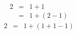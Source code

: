 \begin{eqnarray}
	2 & = & 1 + 1\\
	  & = & 1 + (2-1)
\end{eqnarray}
\begin{eqnarray*}
	2 & = & 1 + (1+1-1)
\end{eqnarray*}
